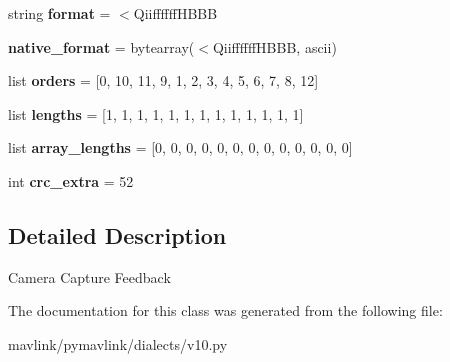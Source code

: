 \begin{DoxyCompactItemize}
\item 
\mbox{\label{classpymavlink_1_1dialects_1_1v10_1_1MAVLink__camera__feedback__message_aa33b87d3b4499a1064ff4ab44ca42c2a}} 
string {\bfseries format} = \textquotesingle{}$<$Qiiffffff\+H\+B\+BB\textquotesingle{}
\item 
\mbox{\label{classpymavlink_1_1dialects_1_1v10_1_1MAVLink__camera__feedback__message_a9cea46fce65cc4caef923fb8fd603438}} 
{\bfseries native\+\_\+format} = bytearray(\textquotesingle{}$<$Qiiffffff\+H\+B\+BB\textquotesingle{}, \textquotesingle{}ascii\textquotesingle{})
\item 
\mbox{\label{classpymavlink_1_1dialects_1_1v10_1_1MAVLink__camera__feedback__message_aa4c3b22b26618065238238feaed66b28}} 
list {\bfseries orders} = \mbox{[}0, 10, 11, 9, 1, 2, 3, 4, 5, 6, 7, 8, 12\mbox{]}
\item 
\mbox{\label{classpymavlink_1_1dialects_1_1v10_1_1MAVLink__camera__feedback__message_a31ab51dd44c8dc9b2cdb52abb5920901}} 
list {\bfseries lengths} = \mbox{[}1, 1, 1, 1, 1, 1, 1, 1, 1, 1, 1, 1, 1\mbox{]}
\item 
\mbox{\label{classpymavlink_1_1dialects_1_1v10_1_1MAVLink__camera__feedback__message_a04ee843a5ac958ada333d484918f85e5}} 
list {\bfseries array\+\_\+lengths} = \mbox{[}0, 0, 0, 0, 0, 0, 0, 0, 0, 0, 0, 0, 0\mbox{]}
\item 
\mbox{\label{classpymavlink_1_1dialects_1_1v10_1_1MAVLink__camera__feedback__message_a5c0492b27a562deda03738474cf06726}} 
int {\bfseries crc\+\_\+extra} = 52
\end{DoxyCompactItemize}


\subsection{Detailed Description}
\begin{DoxyVerb}Camera Capture Feedback
\end{DoxyVerb}
 

The documentation for this class was generated from the following file\+:\begin{DoxyCompactItemize}
\item 
mavlink/pymavlink/dialects/v10.\+py\end{DoxyCompactItemize}
